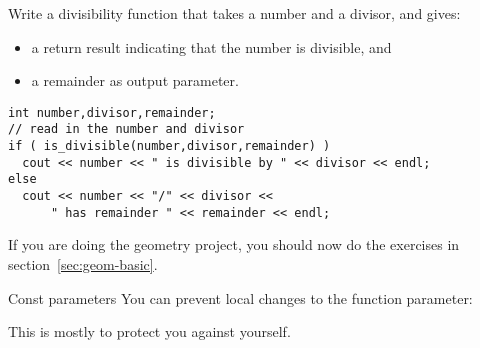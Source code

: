\begin{exercise}
  \label{ex:div-remain}
  Write a divisibility function that takes a number and a divisor, and gives:
  \begin{itemize}
  \item a  return result indicating that the number is
    divisible, and
  \item a remainder as output parameter.
  \end{itemize}

{\small
\begin{lstlisting}
int number,divisor,remainder;
// read in the number and divisor
if ( is_divisible(number,divisor,remainder) )
  cout << number << " is divisible by " << divisor << endl;
else
  cout << number << "/" << divisor <<
      " has remainder " << remainder << endl;
\end{lstlisting}
}
\end{exercise}

\begin{exercise}
  If you are doing the geometry project, you should now do the exercises
  in section~\ref{sec:geom-basic}.
\end{exercise}

\begin{block}{Const parameters}
  \label{sl:pass-constref}
  You can prevent local changes to the function parameter:


  This is mostly to protect you against yourself.
\end{block}

